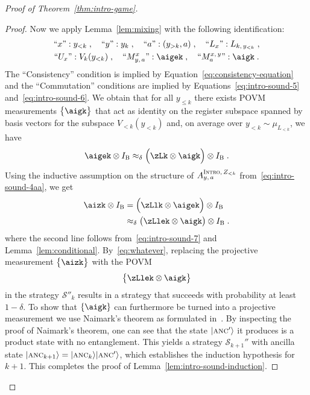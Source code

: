 \documentclass[11pt]{article}
\theoremstyle{definition}
\newcommand{\ket}[1]{|#1\rangle}
\newcommand{\Id}{\ensuremath{I}}
\newcommand{\ib}{\Id_\bob}
\newcommand{\strategy}{\mathscr{S}}
\newcommand{\gamestyle}[1]{\ensuremath{\textsc{#1}}\xspace}
\newcommand{\intro}{\gamestyle{Intro}}
\newcommand{\labelstyle}[1]{\ensuremath{\textsc{#1}}\xspace}
\newcommand{\ancilla}{\labelstyle{anc}}
\newcommand{\bob}{\labelstyle{B}}
\begin{document}
\begin{proof}[Proof of Theorem~\ref{thm:intro-game}]
\begin{proof}
    Now we apply Lemma~\ref{lem:mixing} with the following identification:
    \begin{gather*}
      \text{``$x$''}: y_{< k} \;, \quad
      \text{``$y$''}: y_{k} \;, \quad
      \text{``$a$''}: (y_{> k}, a) \;, \quad
      \text{``$L_x$''}: L_{k,\, y_{<k}} \;,\\
      \text{``$U_x$''}: V_k(y_{< k}) \;, \quad
      \text{``$M^{x}_{y,\, a}$''}: \aigek \;, \quad
      \text{``$M^{x,\, y}_a$''}: \aigk \;.
    \end{gather*}
    The ``Consistency'' condition is implied by
    Equation~\eqref{eq:consistency-equation} and the ``Commutation'' conditions
    are implied by Equations~\eqref{eq:intro-sound-5}
    and~\eqref{eq:intro-sound-6}.
    We obtain that for all $y_{\leq k}$ there exists POVM measurements $\bigl\{
    \aigk \bigr\}$ that act as identity on the register subspace spanned by
    basis vectors for the subspace $V_{< k}(y_{<k})$ and, on average over
    $y_{<k} \sim \mu_{L_{<k}}$, we have
    \begin{equation}\label{eq:intro-sound-7}
      \aigek \otimes \ib
      \approx_\delta \Bigl( \zLk \otimes \aigk  \Bigr)
      \otimes \ib\;.
    \end{equation}
    Using the inductive assumption on the structure of $A^{\intro,\,
      Z_{<k}}_{y,\, a} $ from~\eqref{eq:intro-sound-4aa}, we get
    \begin{align}
      \aizk \otimes \ib
      & = \Bigl( \zLlk \otimes \aigek \Bigr) \otimes \ib \\
      & \approx_\delta \bigl( \zLlek \otimes \aigk \bigr) \otimes \ib\;.
        \label{eq:whatever}
    \end{align}
    where the second line follows from~\eqref{eq:intro-sound-7} and
    Lemma~\ref{lem:conditional}.
    By~\eqref{eq:whatever}, replacing the projective measurement $\bigl\{\aizk
    \bigr\}$ with the POVM
    \begin{equation*}
      \bigl\{\zLlek \otimes \aigk \bigr\}
    \end{equation*}
    in the strategy $\strategy''_k$ results in a strategy that succeeds with
    probability at least $1 - \delta$.
    To show that $\{\aigk\}$ can furthermore be turned into a projective
    measurement we use Naimark's theorem as formulated in~\cite[Theorem
    4.2]{NW19}.
    By inspecting the proof of Naimark's theorem, one can see that the state
    $\ket{\ancilla'}$ it produces is a product state with no entanglement.
    This yields a strategy $\strategy_{k+1}''$ with ancilla state
    $\ket{\ancilla_{k+1}} = \ket{\ancilla_k}\ket{\ancilla'}$, which establishes
    the induction hypothesis for $k+1$.
    This completes the proof of Lemma~\ref{lem:intro-sound-induction}.
  \end{proof}


\end{proof}
\end{document}
